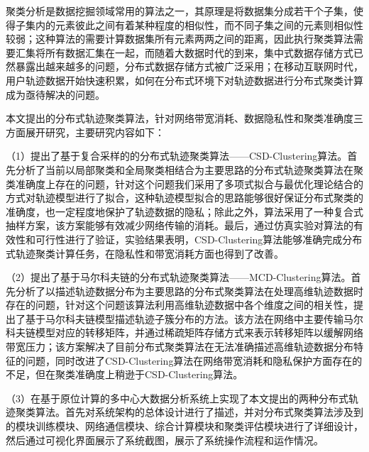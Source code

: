 	
\begin{chineseabstract}
聚类分析是数据挖掘领域常用的算法之一，其原理是将数据集分成若干个子集，使得子集内的元素彼此之间有着某种程度的相似性，而不同子集之间的元素则相似性较弱；这种算法的需要计算数据集所有元素两两之间的距离，因此执行聚类算法需要汇集将所有数据汇集在一起，而随着大数据时代的到来，集中式数据存储方式已然暴露出越来越多的问题，分布式数据存储方式被广泛采用；在移动互联网时代，用户轨迹数据开始快速积累，如何在分布式环境下对轨迹数据进行分布式聚类计算成为亟待解决的问题。

本文提出的分布式轨迹聚类算法，针对网络带宽消耗、数据隐私性和聚类准确度三方面展开研究，主要研究内容如下：

（1）提出了基于复合采样的的分布式轨迹聚类算法——CSD-Clustering算法。首先分析了当前以局部聚类和全局聚类相结合为主要思路的分布式轨迹聚类算法在聚类准确度上存在的问题，针对这个问题我们采用了多项式拟合与最优化理论结合的方式对轨迹模型进行了拟合，这种轨迹模型拟合的思路能够很好保证分布式聚类的准确度，也一定程度地保护了轨迹数据的隐私；除此之外，算法采用了一种复合式抽样方案，该方案能够有效减少网络传输的消耗。最后，通过仿真实验对算法的有效性和可行性进行了验证，实验结果表明，CSD-Clustering算法能够准确完成分布式轨迹聚类计算任务，在隐私性和带宽消耗方面也得到了改善。

（2）提出了基于马尔科夫链的分布式轨迹聚类算法——MCD-Clustering算法。首先分析了以描述轨迹数据分布为主要思路的分布式聚类算法在处理高维轨迹数据时存在的问题，针对这个问题该算法利用高维轨迹数据中各个维度之间的相关性，提出了基于马尔科夫链模型描述轨迹子簇分布的方法。该方法在网络中主要传输马尔科夫链模型对应的转移矩阵，并通过稀疏矩阵存储方式来表示转移矩阵以缓解网络带宽压力；该方案解决了目前分布式聚类算法在无法准确描述高维轨迹数据分布特征的问题，同时改进了CSD-Clustering算法在网络带宽消耗和隐私保护方面存在的不足，但在聚类准确度上稍逊于CSD-Clustering算法。

（3）在基于原位计算的多中心大数据分析系统上实现了本文提出的两种分布式轨迹聚类算法。首先对系统架构的总体设计进行了描述，并对分布式聚类算法涉及到的模块训练模块、网络通信模块、综合计算模块和聚类评估模块进行了详细设计，然后通过可视化界面展示了系统截图，展示了系统操作流程和运作情况。

\end{chineseabstract}